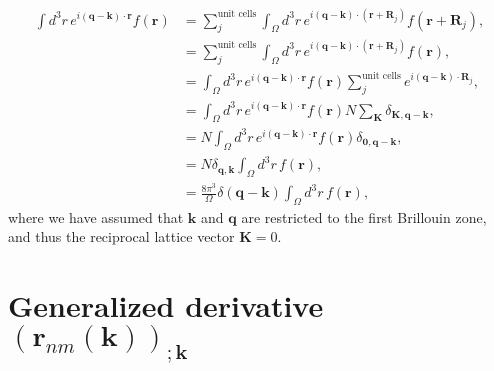 \begin{align}\label{a_6}
\int d^{3}r\, e^{i(\mathbf{q}-\mathbf{k})\cdot\mathbf{r}}f(\mathbf{r})
& =
\sum_{j}^{\mbox{unit cells}}\int_{\Omega}d^{3}r\,
e^{i(\mathbf{q}-\mathbf{k})\cdot(\mathbf{r}+\mathbf{R}_{j})}f(\mathbf{r}+\mathbf{R}_{j}),
\nonumber
\\
& = \sum_{j}^{\mbox{unit cells}}\int_{\Omega}d^{3}r\,
 e^{i(\mathbf{q}-\mathbf{k})\cdot(\mathbf{r}+\mathbf{R}_{j})}f(\mathbf{r}),
\nonumber
\\
& = \int_{\Omega}d^{3}r\, e^{i(\mathbf{q}-\mathbf{k})\cdot\mathbf{r}}f(\mathbf{r})\sum_{j}^{\mbox{unit cells}}e^{i(\mathbf{q}-\mathbf{k})\cdot\mathbf{R}_{j}},\nonumber
\\
& = \int_{\Omega}d^{3}r\, e^{i(\mathbf{q}-\mathbf{k})\cdot\mathbf{r}}f(\mathbf{r})N\sum_{\mathbf{K}}\delta_{\mathbf{K},\mathbf{q}-\mathbf{k}},\nonumber
\\
& = N\int_{\Omega}d^{3}r\, e^{i(\mathbf{q}-\mathbf{k})\cdot\mathbf{r}}f(\mathbf{r})\delta_{\mathbf{0},\mathbf{q}-\mathbf{k}},\nonumber
\\
& = N\delta_{\mathbf{q},\mathbf{k}}\int_{\Omega}d^{3}r\, f(\mathbf{r}),\nonumber
\\
& = \frac{8\pi^{3}}{\Omega}\delta(\mathbf{q}-\mathbf{k})\int_{\Omega}d^{3}r\,
 f(\mathbf{r})
,
\end{align}
where we have assumed that $\mathbf{k}$ and $\mathbf{q}$ are restricted to the
first Brillouin zone, and thus the reciprocal lattice vector $\mathbf{K}=0$.



\section{Generalized derivative $(\mathbf{r}_{nm}(\mathbf{k}))_{;\mathbf{k}}$}\label{gder}

